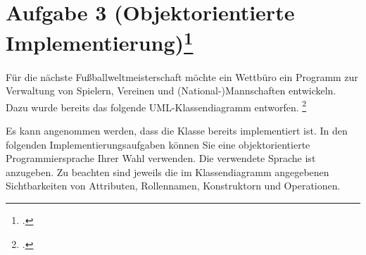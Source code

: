 \documentclass{lehramt-informatik-minimal}
\begin{document}
\section{Aufgabe 3 (Objektorientierte Implementierung)\footcite{oomup:pu:4}}

Für die nächste Fußballweltmeisterschaft möchte ein Wettbüro ein
Programm zur Verwaltung von Spielern, Vereinen und
(National-)Mannschaften entwickeln. Dazu wurde bereits das folgende
UML-Klassendiagramm entworfen.
\footcite[Thema 1 TA 1 Aufgabe 3]{examen:46116:2018:03}

\begin{center}
\end{center}

\noindent
Es kann angenommen werden, dass die Klasse  bereits
implementiert ist. In den folgenden Implementierungsaufgaben können Sie
eine objektorientierte Programmiersprache Ihrer Wahl verwenden. Die
verwendete Sprache ist anzugeben. Zu beachten sind jeweils die im
Klassendiagramm angegebenen Sichtbarkeiten von Attributen, Rollennamen,
Konstruktorn und Operationen.
\end{document}
